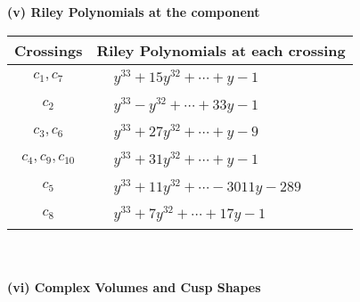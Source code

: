 \documentclass[1p]{elsarticle_modified}
\theoremstyle{definition}
\begin{document}
\newpage\renewcommand{\arraystretch}{1}
\flushleft \textbf{(v) Riley Polynomials at the component}\newline \\
\begin{tabular}{m{50pt}|m{274pt}}
Crossings & \hspace{64pt}Riley Polynomials at each crossing \\
\hline $$\begin{aligned}c_{1},c_{7}\end{aligned}$$&$\begin{aligned}
&y^{33}+15 y^{32}+\cdots+y-1
\end{aligned}$\\
\hline $$\begin{aligned}c_{2}\end{aligned}$$&$\begin{aligned}
&y^{33}- y^{32}+\cdots+33 y-1
\end{aligned}$\\
\hline $$\begin{aligned}c_{3},c_{6}\end{aligned}$$&$\begin{aligned}
&y^{33}+27 y^{32}+\cdots+y-9
\end{aligned}$\\
\hline $$\begin{aligned}c_{4},c_{9},c_{10}\end{aligned}$$&$\begin{aligned}
&y^{33}+31 y^{32}+\cdots+y-1
\end{aligned}$\\
\hline $$\begin{aligned}c_{5}\end{aligned}$$&$\begin{aligned}
&y^{33}+11 y^{32}+\cdots-3011 y-289
\end{aligned}$\\
\hline $$\begin{aligned}c_{8}\end{aligned}$$&$\begin{aligned}
&y^{33}+7 y^{32}+\cdots+17 y-1
\end{aligned}$\\
\hline
\end{tabular}\\~\\
\newpage\flushleft \textbf{(vi) Complex Volumes and Cusp Shapes}
\end{document}
